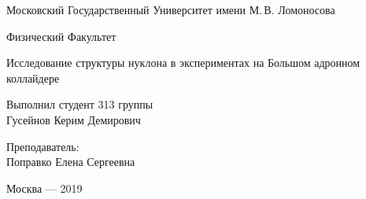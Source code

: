 \documentclass[12pt, a4paper]{article}
\begin{document}
\thispagestyle{empty}
\vspace*{-50pt}
\begin{center}
\sc Московский Государственный Университет имени М.\,В. Ломоносова
\end{center}
\vspace*{-1.2\baselineskip}
\hrulefill
\vspace*{-.65\baselineskip}
\begin{center}\sc Физический Факультет\end{center}
\vspace{180 pt}
\begin{center}
\fontsize{22}{22}\selectfont 
Исследование структуры нуклона в экспериментах на Большом адронном коллайдере
\end{center}
\vfill
\begin{flushright}
Выполнил студент 313 группы\\ Гусейнов Керим Демирович %

Преподаватель:\hspace*{3.5pt}%
\\Поправко Елена Сергеевна
\end{flushright}

\vspace{7cm}

\begin{center}
Москва --- 2019
\end{center}

\newpage
\tableofcontents

\newpage








\end{document}
